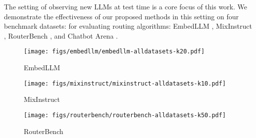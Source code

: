 
The setting of observing new LLMs at test time is a core focus of this work.
We demonstrate the effectiveness of our 
proposed methods in this setting
on four benchmark datasets: 
for evaluating routing algorithms: EmbedLLM \citep{ZhuWuWen2024}, MixInstruct \citep{Jiang:2023},   RouterBench \citep{HuBieLi2024}, and Chatbot Arena \citep{ZheChiShe2023}.


\begin{figure*}[!t]
  \begin{minipage}[b]{.98\linewidth}
  \hspace{4mm}
    \begin{subfigure}{0.32\textwidth}
        \texttt{[image: figs/embedllm/embedllm-alldatasets-k20.pdf]}
        \caption{EmbedLLM}
        \label{fig:embedllm}
    \end{subfigure}
    \begin{subfigure}{0.32\textwidth}
        \texttt{[image: figs/mixinstruct/mixinstruct-alldatasets-k10.pdf]}
        \caption{MixInstruct}
        \label{fig:mixinstruct}
    \end{subfigure}
    \begin{subfigure}{0.32\textwidth}
        \texttt{[image: figs/routerbench/routerbench-alldatasets-k50.pdf]}
        \caption{RouterBench}
        \label{fig:routerbench}
    \end{subfigure}
  \end{minipage}
  \hfill
  \begin{minipage}[b]{.98\linewidth}
  \centering
\end{minipage}
\end{figure*}
